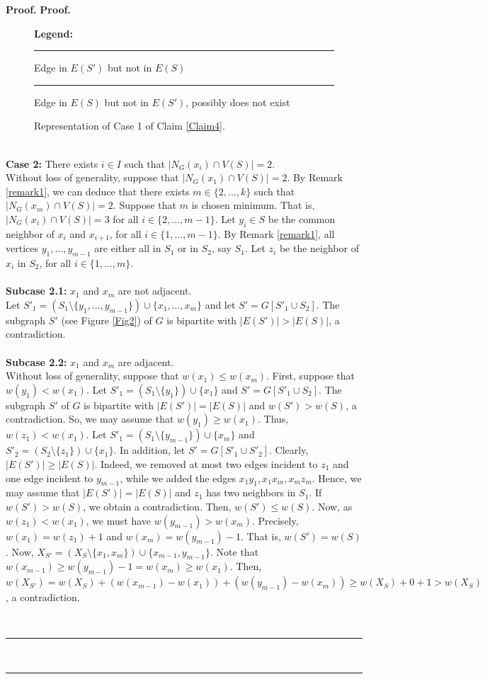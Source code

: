 \documentclass[12pt, oneside]{scrartcl}
\newenvironment{proof}[1][Proof]{\textbf{#1.} }{\ \rule{0.5em}{0.5em}}
\begin{document}
\begin{proof}
\begin{proof}
\begin{figure}[h!]
\begin{minipage}[t]{0.5\textwidth}
\centering
\textbf{Legend:}\\
\textcolor{green}{\rule{10pt}{2pt}} \quad Edge in $E(S')$ but not in $E(S)$ \\
\textcolor{red}{\rule{10pt}{2pt}} \quad Edge in $E(S)$ but not in $E(S')$, possibly does not exist
\end{minipage}
\caption{Representation of Case 1 of Claim \ref{Claim4}.}
\end{figure}
\\
\textbf{Case 2:} There exists $i\in I$ such that $|N_G(x_i)\cap V(S)|=2$.\\
Without loss of generality, suppose that $|N_G(x_1)\cap V(S)|=2$. By Remark \ref{remark1}, we can deduce that there exists $m\in \{2,\dots ,k\}$ such that $|N_G(x_m)\cap V(S)|=2$. Suppose that $m$ is chosen minimum. That is, $|N_G(x_i)\cap V(S)|=3$ for all $i\in \{2,\dots ,m-1\}$. Let $y_i\in S$ be the common neighbor of $x_i$ and $x_{i+1}$, for all $i\in \{1,\dots ,m-1\}$. By Remark \ref{remark1}, all vertices $y_1,\dots ,y_{m-1}$ are either all in $S_1$ or in $S_2$, say $S_1$. Let $z_i$ be the neighbor of $x_i$ in $S_2$, for all $i\in \{1,\dots ,m\}$.\\
\\
\textbf{Subcase 2.1:} $x_1$ and $x_m$ are not adjacent.\\
Let $S'_1=(S_1\setminus \{y_1,\dots ,y_{m-1}\})\cup \{x_1,\dots ,x_m\}$ and let $S'=G[S'_1\cup S_2]$. The subgraph $S'$ (see Figure \ref{Fig2}) of $G$ is bipartite with $|E(S')|>|E(S)|$, a contradiction.\\
\\
\textbf{Subcase 2.2:} $x_1$ and $x_m$ are adjacent.\\
Without loss of generality, suppose that $w(x_1)\leq w(x_m)$. First, suppose that $w(y_1)<w(x_1)$. Let $S'_1=(S_1\setminus \{y_1\})\cup \{x_1\}$ and $S'=G[S'_1\cup S_2]$. The subgraph $S'$ of $G$ is bipartite with $|E(S')|=|E(S)|$ and $w(S')>w(S)$, a contradiction. So, we may assume that $w(y_1)\geq w(x_1)$. Thus, $w(z_1)<w(x_1)$. Let $S'_1=(S_1\setminus \{y_{m-1}\})\cup \{x_m\}$ and $S'_2=(S_2\setminus \{z_1\})\cup \{x_1\}$. In addition, let $S'=G[S'_1\cup S'_2]$. Clearly, $|E(S')|\geq |E(S)|$. Indeed, we removed at most two edges incident to $z_1$ and one edge incident to $y_{m-1}$, while we added the edges $x_1y_1,x_1x_m,x_mz_m$. Hence, we may assume that $|E(S')|=|E(S)|$ and $z_1$ has two neighbors in $S_1$. If $w(S')>w(S)$, we obtain a contradiction. Then, $w(S')\leq w(S)$. Now, as $w(z_1)<w(x_1)$, we must have $w(y_{m-1})>w(x_m)$. Precisely, $w(x_1)=w(z_1)+1$ and $w(x_m)=w(y_{m-1})-1$. That is, $w(S')=w(S)$. Now, $X_{S'}=(X_S\setminus \{x_1,x_m\})\cup \{x_{m-1},y_{m-1}\}$. Note that $w(x_{m-1})\geq w(y_{m-1})-1=w(x_m)\geq w(x_1)$. Then, $w(X_{S'})=w(X_S)+(w(x_{m-1})-w(x_1))+(w(y_{m-1})-w(x_m))\geq w(X_S)+0+1>w(X_S)$, a contradiction.

\end{proof}
\end{proof}
\end{document}

